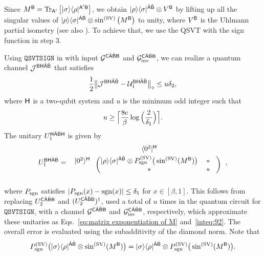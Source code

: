 Since $M^{\mathsf{B}} = \operatorname{Tr}_{{\mathsf{A}}'}\big[|\sigma\rangle\langle\rho|^{{\mathsf{A}}'{\mathsf{B}}}\big]$, we obtain $|\rho\rangle\langle\sigma|^{\hat{{\mathsf{A}}}\hat{{\mathsf{B}}}} \otimes V^{\mathsf{B}}$ by lifting up all the singular values of $|\rho\rangle\langle\sigma|^{\hat{{\mathsf{A}}}\hat{{\mathsf{B}}}}\otimes \sin^{(\rm SV)}\big(M^{\mathsf{B}}\big)$ to unity, where $V^{\mathsf{B}}$ is the Uhlmann partial isometry (see also ).
To achieve that, we use the QSVT with the sign function in step 3.


Using $\mathtt{QSVTSIGN}$ in  with input ${\mathcal{G}}^{{\mathsf{C}}\hat{{\mathsf{A}}}\hat{{\mathsf{B}}}{\mathsf{B}}}$ and ${\mathcal{G}}_{\rm inv}^{{\mathsf{C}}\hat{{\mathsf{A}}}\hat{{\mathsf{B}}}{\mathsf{B}}}$, we can realize a quantum channel ${\mathcal{J}}^{{\mathsf{B}}{\mathsf{H}}\hat{{\mathsf{A}}}\hat{{\mathsf{B}}}}$ that satisfies
\begin{equation}
\label{inteq:16}
    \frac{1}{2}\big\|{\mathcal{J}}^{{\mathsf{B}}{\mathsf{H}}\hat{{\mathsf{A}}}\hat{{\mathsf{B}}}} - {\mathcal{U}}_1^{{\mathsf{B}}{\mathsf{H}}\hat{{\mathsf{A}}}\hat{{\mathsf{B}}}}\big\|_\diamond \leq u\delta_2,
\end{equation}
where ${\mathsf{H}}$ is a two-qubit system and $u$ is the minimum odd integer such that 
\begin{align} 
\label{eq:u} 
    u \geq \Big\lceil \frac{8 e}{\beta}\log{\Big(\frac{2}{\delta_1}\Big)} \Big\rceil.
\end{align}
The unitary $U_1^{{\mathsf{H}}\hat{{\mathsf{A}}}\hat{{\mathsf{B}}}{\mathsf{H}}}$ is given by
\begin{align}
\label{inteq:61}
    U_1^{\sB\sH\hat{\sA}\hat{\sB}} 
    = \hspace{1mm}
\begin{blockarray}{ccc}
& \bra{0^2}^\sH&  \vspace{1mm}\\
\begin{block}{c(cc)}
  \ket{0^2}^\sH \hspace*{1mm} & \ketbra{\rho}{\sigma}^{\hat{\sA}\hat{\sB}}\otimes P_\sgn^{(\rm SV)}\big(\sin^{(\rm SV)}(M^\sB)\big) & \hspace{0mm} * \hspace{3mm}\\
  & * & \hspace{0mm} * \hspace{3mm}\\
\end{block}
\end{blockarray}\hspace{2.5mm},
\end{align}
where $P_{\mathrm{sgn}}$ satisfies $|P_{\mathrm{sgn}}(x) - \mathrm{sgn}(x)| \leq \delta_1$ for $x \in [\beta, 1]$.
This follows from replacing $U_2^{{\mathsf{C}}\hat{{\mathsf{A}}}\hat{{\mathsf{B}}}{\mathsf{B}}}$ and $(U_2^{{\mathsf{C}}\hat{{\mathsf{A}}}\hat{{\mathsf{B}}}{\mathsf{B}}})^\dag$, used a total of $u$ times in the quantum circuit for $\mathtt{QSVTSIGN}$, with a channel ${\mathcal{G}}^{{\mathsf{C}}\hat{{\mathsf{A}}}\hat{{\mathsf{B}}}{\mathsf{B}}}$ and ${\mathcal{G}}_{\rm inv}^{{\mathsf{C}}\hat{{\mathsf{A}}}\hat{{\mathsf{B}}}{\mathsf{B}}}$, respectively, which approximate these unitaries as Eqs.~\eqref{eq:matrix exponentiation of M} and~\eqref{inteq:92}.
The overall error is evaluated using the subadditivity of the diamond norm.
Note that
\begin{align}
    P_{\mathrm{sgn}}^{(\rm SV)}\big(|\sigma\rangle\langle\rho|^{\hat{{\mathsf{A}}}\hat{{\mathsf{B}}}} \otimes \sin^{(\rm SV)}(M^{\mathsf{B}})\big)
    = |\sigma\rangle\langle\rho|^{\hat{{\mathsf{A}}}\hat{{\mathsf{B}}}} \otimes P_{\mathrm{sgn}}^{(\rm SV)}\big(\sin^{(\rm SV)}(M^{\mathsf{B}})\big).
\end{align}




